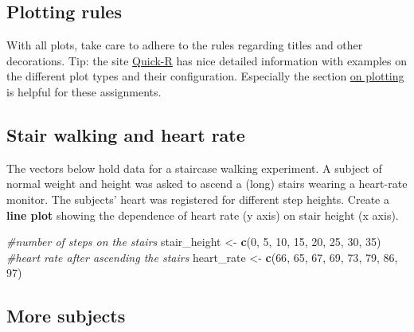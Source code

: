 \documentclass[]{book}
\newenvironment{Shaded}{\begin{snugshade}}{\end{snugshade}}
\newcommand{\CommentTok}[1]{\textcolor[rgb]{0.56,0.35,0.01}{\textit{#1}}}
\newcommand{\DecValTok}[1]{\textcolor[rgb]{0.00,0.00,0.81}{#1}}
\newcommand{\KeywordTok}[1]{\textcolor[rgb]{0.13,0.29,0.53}{\textbf{#1}}}
\newcommand{\NormalTok}[1]{#1}
\newcommand{\StringTok}[1]{\textcolor[rgb]{0.31,0.60,0.02}{#1}}
\begin{document}
\hypertarget{plotting-rules}{%
\subsection*{Plotting rules}\label{plotting-rules}}

With all plots, take care to adhere to the rules regarding titles and other decorations. Tip: the site \href{http://www.statmethods.net/}{Quick-R} has nice detailed information with examples on the different plot types and their configuration. Especially the section \href{http://www.statmethods.net/graphs/index.html}{on plotting} is helpful for these assignments.

\hypertarget{stair-walking-and-heart-rate}{%
\subsection{Stair walking and heart rate}\label{stair-walking-and-heart-rate}}

The vectors below hold data for a staircase walking experiment. A subject of normal weight and height was asked to ascend a (long) stairs wearing a heart-rate monitor. The subjects' heart was registered for different step heights. Create a \textbf{line plot} showing the dependence of heart rate (y axis) on stair height (x axis).

\begin{Shaded}
\begin{Highlighting}[]
\CommentTok{#number of steps on the stairs}
\NormalTok{stair_height <-}\StringTok{ }\KeywordTok{c}\NormalTok{(}\DecValTok{0}\NormalTok{, }\DecValTok{5}\NormalTok{, }\DecValTok{10}\NormalTok{, }\DecValTok{15}\NormalTok{, }\DecValTok{20}\NormalTok{, }\DecValTok{25}\NormalTok{, }\DecValTok{30}\NormalTok{, }\DecValTok{35}\NormalTok{)}
\CommentTok{#heart rate after ascending the stairs}
\NormalTok{heart_rate <-}\StringTok{ }\KeywordTok{c}\NormalTok{(}\DecValTok{66}\NormalTok{, }\DecValTok{65}\NormalTok{, }\DecValTok{67}\NormalTok{, }\DecValTok{69}\NormalTok{, }\DecValTok{73}\NormalTok{, }\DecValTok{79}\NormalTok{, }\DecValTok{86}\NormalTok{, }\DecValTok{97}\NormalTok{)}
\end{Highlighting}
\end{Shaded}

\hypertarget{more-subjects}{%
\subsection{More subjects}\label{more-subjects}}
\end{document}
